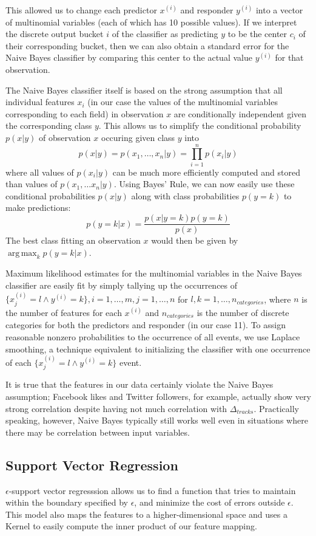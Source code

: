\documentclass[conference]{IEEEtran}
\DeclareMathOperator*{\argmax}{arg\,max}
\begin{document}
This allowed us to change each predictor $x^{(i)}$ and responder $y^{(i)}$ into a vector of multinomial variables (each of which has 10 possible values). If we interpret the discrete output bucket $i$ of the classifier as predicting $y$ to be the center $c_i$ of their corresponding bucket, then we can also obtain a standard error for the Naive Bayes classifier by comparing this center to the actual value $y^{(i)}$ for that observation.

The Naive Bayes classifier itself is based on the strong assumption that all individual features $x_i$ (in our case the values of the multinomial variables corresponding to each field) in observation $x$ are conditionally independent given the corresponding class $y$. This allows us to simplify the conditional probability $p(x|y)$ of observation $x$ occuring given class $y$ into
$$p(x|y) = p(x_1,\dots,x_n | y) = \prod_{i=1}^n p(x_i|y)$$
where all values of $p(x_i|y)$ can be much more efficiently computed and stored than values of $p(x_1,\dots x_n|y)$. Using Bayes' Rule, we can now easily use these conditional probabilities $p(x|y)$ along with class probabilities $p(y=k)$ to make predictions:
$$p(y=k|x) = \frac{p(x|y=k)p(y=k)}{p(x)}$$
The best class fitting an observation $x$ would then be given by $\argmax_k p(y=k|x)$.

Maximum likelihood estimates for the multinomial variables in the Naive Bayes classifier are easily fit by simply tallying up the occurrences of $\{x^{(i)}_j = l \wedge y^{(i)} = k\}, i=1,\dots,m, j=1,\dots,n$ for $l,k=1,\dots,n_{categories}$, where $n$ is the number of features for each $x^{(i)}$ and $n_{categories}$ is the number of discrete categories for both the predictors and responder (in our case 11). To assign reasonable nonzero probabilities to the occurrence of all events, we use Laplace smoothing, a technique equivalent to initializing the classifier with one occurrence of each $\{x^{(i)}_j = l \wedge y^{(i)} = k\}$ event.

It is true that the features in our data certainly violate the Naive Bayes assumption; Facebook likes and Twitter followers, for example, actually show very strong correlation despite having not much correlation with $\Delta_{tracks}$. Practically speaking, however, Naive Bayes typically still works well even in situations where there may be correlation between input variables.

\subsection{Support Vector Regression}
$\epsilon$-support vector regresssion allows us to find a function that tries to maintain within the boundary specified by $\epsilon$, and minimize the cost of errors outside $\epsilon$. This model also maps the features to a higher-dimensional space and uses a Kernel to easily compute the inner product of our feature mapping.
\end{document}
